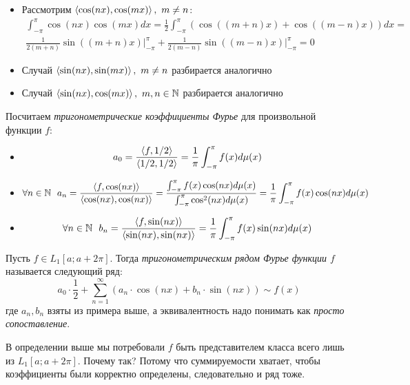 \begin{example}
\begin{enumerate}
\begin{itemize}
			\item Рассмотрим $\tbr{\cos(nx), \cos(mx)},\ m \neq n$:
			\begin{multline*}
				\int_{-\pi}^\pi \cos(nx)\cos(mx)dx = \frac{1}{2} \int_{-\pi}^\pi (\cos((m + n)x) + \cos((m - n)x))dx =
				\\
				\frac{1}{2(m + n)}\sin((m + n)x)\Big|_{-\pi}^\pi + \frac{1}{2(m - n)}\sin((m - n)x)\Big|_{-\pi}^\pi = 0
			\end{multline*}
			
			\item Случай $\left\langle\sin(nx), \sin(mx)\right\rangle,\ m \neq n$ разбирается аналогично
			
			\item Случай $\left\langle\sin(nx), \cos(mx)\right\rangle,\ m, n \in \mathbb{N}$ разбирается аналогично
		\end{itemize}
		Посчитаем \textit{тригонометрические коэффициенты Фурье} для произвольной функции $f$:
		\begin{itemize}
			\item \[
				a_0 = \frac{\left\langle f, 1 / 2\right\rangle}{\left\langle1 / 2, 1 / 2\right\rangle} = \frac{1}{\pi} \int_{-\pi}^\pi f(x)d\mu(x)
			\]
			
			\item \[
				\forall n \in \mathbb{N}\ \ a_n = \frac{\left\langle f, \cos(nx)\right\rangle}{\left\langle\cos(nx), \cos(nx)\right\rangle} = \frac{\int_{-\pi}^\pi f(x)\cos(nx)d\mu(x)}{\int_{-\pi}^\pi \cos^2(nx)d\mu(x)} = \frac{1}{\pi} \int_{-\pi}^\pi f(x)\cos(nx)d\mu(x)
			\]
			
			\item \[
				\forall n \in \mathbb{N}\ \ b_n = \frac{\left\langle f, \sin(nx)\right\rangle}{\left\langle\sin(nx), \sin(nx)\right\rangle} = \frac{1}{\pi} \int_{-\pi}^\pi f(x)\sin(nx)d\mu(x)
			\]
		\end{itemize}
	\end{enumerate}
\end{example}

\begin{definition}
	Пусть $f \in L_1[a; a + 2\pi]$. Тогда \textit{тригонометрическим рядом Фурье функции $f$} называется следующий ряд:
	\[
		a_0 \cdot \frac{1}{2} + \sum_{n = 1}^\infty (a_n \cdot \cos(nx) + b_n \cdot \sin(nx)) \sim f(x)
	\]
	где $a_n, b_n$ взяты из примера выше, а эквивалентность надо понимать как \textit{просто сопоставление}.
\end{definition}

\begin{note}
	В определении выше мы потребовали $f$ быть представителем класса всего лишь из $L_1[a; a + 2\pi]$. Почему так? Потому что суммируемости хватает, чтобы коэффициенты были корректно определены, следовательно и ряд тоже.
\end{note}

